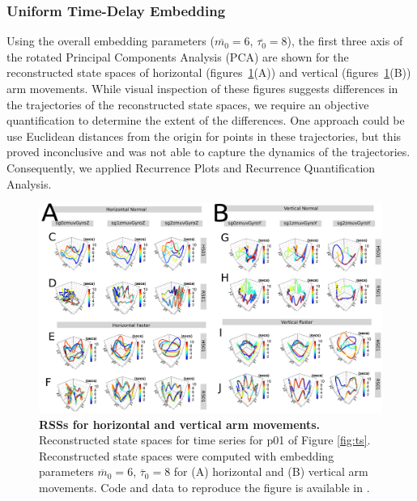 \documentclass[fleqn,10pt]{wlscirep}
\begin{document}
\subsubsection*{Uniform Time-Delay Embedding}
Using the overall embedding parameters ($\overline{m_0}=6$, $\overline{\tau_0}=8$), 
the first three axis of the rotated Principal Components Analysis (PCA) 
are shown for the reconstructed state spaces of horizontal (figures~\ref{fig:rsss}(A)) 
and vertical (figures~\ref{fig:rsss}(B)) arm movements. 
While visual inspection of these figures 
suggests differences in the trajectories of the reconstructed state spaces, 
we require an objective quantification to determine the extent of the differences.  
One approach could be use Euclidean distances from the origin for points in these 
trajectories, but this proved inconclusive and was not able to capture 
the dynamics of the trajectories. Consequently, we applied 
Recurrence Plots and Recurrence Quantification Analysis.
\begin{figure}[ht]
\centering
\includegraphics[width=1.0\textwidth]{figures/rss/versions/drawing-v00.pdf}
\caption{
	{\bf RSSs for horizontal and vertical arm movements.}
	Reconstructed state spaces for time series for p01 of Figure \ref{fig:ts}.
	Reconstructed state spaces were computed with 
	embedding parameters 
	$\overline{m}_0=6$, $\overline{\tau}_0=8$
	for (A) horizontal and (B) vertical arm movements.
	Code and data to reproduce the figure is available in \cite{srep2020}.	
        }
    \label{fig:rsss}
\end{figure}
\end{document}

